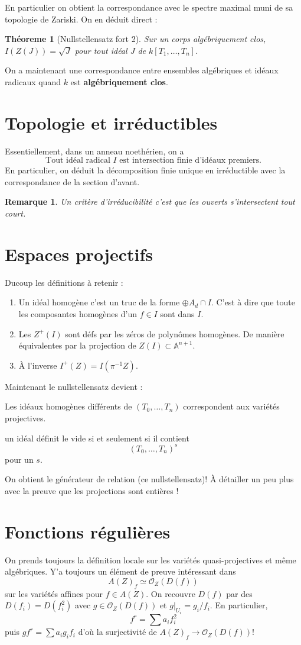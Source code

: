 \documentclass[a4paper,12pt]{book}
\newcommand{\A}{\mathbb{A}}
\newcommand{\Or}{\mathcal{O}}
\theoremstyle{plain}
\newtheorem{thm}[subsection]{Théoreme}
\newtheorem{rem}{Remarque}
\theoremstyle{definition}
\theoremstyle{remark}
\begin{document}
En particulier on obtient la correspondance avec le spectre maximal
muni de sa topologie de Zariski. On en déduit direct :
\begin{thm}[Nullstellensatz fort 2]
    Sur un corps algébriquement clos, $I(Z(J))=\sqrt J$ pour tout idéal
    $J$ de $k[T_1,\ldots, T_n]$.
\end{thm}

On a maintenant une correspondance entre ensembles algébriques et
idéaux radicaux quand $k$ est \textbf{algébriquement clos}.
\section{Topologie et irréductibles}
Essentiellement, dans un anneau noethérien, on a 
\[\textrm{Tout idéal radical } I \textrm{ est intersection finie 
d'idéaux premiers.}\]
En particulier, on déduit la décomposition finie unique en irréductible
avec la correspondance de la section d'avant.
\begin{rem}
    Un critère d'irréducibilité c'est que les ouverts s'intersectent
    tout court.
\end{rem}

\section{Espaces projectifs}
Ducoup les définitions à retenir :
\begin{enumerate}
    \item Un idéal homogène c'est un truc de la forme $\oplus A_d\cap I$.
	C'est à dire que toute les composantes homogènes d'un $f\in I$ 
	sont dans $I$.
    \item Les $Z^+(I)$ sont défs par les zéros de polynômes homogènes.
	De manière équivalentes par la projection de
	$Z(I)\subset \A^{n+1}$.
    \item À l'inverse $I^+(Z)=I(\pi^{-1}Z)$. 
\end{enumerate}
Maintenant le nullstellensatz devient :
\begin{center}
    Les idéaux homogènes différents de $(T_0,\ldots,T_n)$ correspondent
    aux variétés projectives.
\end{center}
un idéal définit le vide si et seulement si il contient
\[(T_0,\ldots,T_n)^s\] pour un $s$.

On obtient le générateur de relation (ce nullstellensatz)! À détailler un
peu plus avec la preuve que les projections sont entières !

\section{Fonctions régulières}
On prends toujours la définition locale sur les variétés 
quasi-projectives et même algébriques. Y'a toujours un élément de preuve
intéressant dans 
\[A(Z)_f\simeq \Or_Z(D(f))\]
sur les variétés affines pour $f\in A(Z)$. On recouvre $D(f)$ par des
$D(f_i)=D(f_i^2)$ avec $g\in \Or_Z(D(f))$ et $g|_{U_i}=g_i/f_i$.
En particulier, 
\[f^r=\sum a_if_i^2\]
puis $gf^r=\sum a_ig_if_i$ d'où la surjectivité de 
$A(Z)_f\to \Or_Z(D(f))$! 
\end{document}
